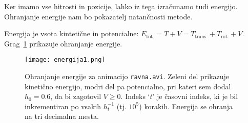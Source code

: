 \documentclass[a4 paper, 12pt]{article}
\begin{document}
Ker imamo vse hitrosti in pozicije, lahko iz tega izra\v cunamo tudi energijo. Ohranjanje energije nam bo pokazatelj
natan\v cnosti metode.

Energija je vsota kinteti\v cne in potencialne: $E_\text{tot.} = T + V = T_\text{trans.} + T_\text{rot.} + V$.
Grag~\ref{gr1} prikazuje ohranjanje energije.

\begin{figure}[H]\centering
    \texttt{[image: energija1.png]}
    \caption{Ohranjanje energije za animacijo {\tt ravna.avi}. Zeleni del prikazuje kineti\v cno energijo, modri
        del pa potencialno, pri kateri sem dodal $h_0 = 0.6$, da bi zagotovil $V \geq 0$. Indeks `$t$' je
        \v casovni indeks, ki je bil inkrementiran po vsakih $h_t^{-1}$ (tj. $10^5$) korakih. Energija se ohranja
        na tri decimalna mesta.}
    \label{gr1}
\end{figure}
\end{document}
